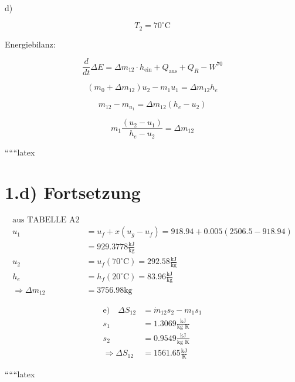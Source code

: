 d)

\[
T_2 = 70^\circ \text{C}
\]

Energiebilanz:

\[
\frac{d}{dt} \Delta E = \Delta m_{12} \cdot h_{\text{ein}} + Q_{\text{aus}} + Q_R - W^{70}
\]

\[
(m_0 + \Delta m_{12}) u_2 - m_1 u_1 = \Delta m_{12} h_e
\]

\[
m_{12} - m_{u_1} = \Delta m_{12} (h_e - u_2)
\]

\[
m_1 \frac{(u_2 - u_1)}{h_e - u_2} = \Delta m_{12}
\]

``````latex


\section*{1.d) Fortsetzung}

\begin{align*}
\text{aus TABELLE A2} \\
u_1 &= u_f + x \left( u_g - u_f \right) = 918.94 + 0.005 \left( 2506.5 - 918.94 \right) \\
&= 929.3778 \frac{\text{kJ}}{\text{kg}} \\
u_2 &= u_f (70^\circ \text{C}) = 292.58 \frac{\text{kJ}}{\text{kg}} \\
h_e &= h_f (20^\circ \text{C}) = 83.96 \frac{\text{kJ}}{\text{kg}} \\
\Rightarrow \Delta m_{12} &= 3756.98 \text{kg}
\end{align*}

\begin{align*}
\text{e)} \quad \Delta S_{12} &= \dot{m}_{12} s_2 - m_1 s_1 \\
s_1 &= 1.3069 \frac{\text{kJ}}{\text{kg K}} \\
s_2 &= 0.9549 \frac{\text{kJ}}{\text{kg K}} \\
\Rightarrow \Delta S_{12} &= 1561.65 \frac{\text{kJ}}{\text{K}}
\end{align*}

``````latex